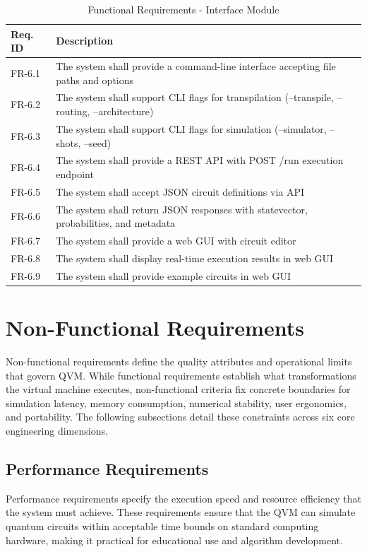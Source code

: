 \begin{table}[H]
\centering
\caption{Functional Requirements - Interface Module}
\begin{tabular}{|p{2cm}|p{11cm}|}
\hline
\textbf{Req. ID} & \textbf{Description} \\
\hline
FR-6.1 & The system shall provide a command-line interface accepting file paths and options \\
\hline
FR-6.2 & The system shall support CLI flags for transpilation (--transpile, --routing, --architecture) \\
\hline
FR-6.3 & The system shall support CLI flags for simulation (--simulator, --shots, --seed) \\
\hline
FR-6.4 & The system shall provide a REST API with POST /run execution endpoint \\
\hline
FR-6.5 & The system shall accept JSON circuit definitions via API \\
\hline
FR-6.6 & The system shall return JSON responses with statevector, probabilities, and metadata \\
\hline
FR-6.7 & The system shall provide a web GUI with circuit editor \\
\hline
FR-6.8 & The system shall display real-time execution results in web GUI \\
\hline
FR-6.9 & The system shall provide example circuits in web GUI \\
\hline
\end{tabular}
\end{table}

\section{Non-Functional Requirements}

Non-functional requirements define the quality attributes and operational limits that govern QVM. While functional requirements establish what transformations the virtual machine executes, non-functional criteria fix concrete boundaries for simulation latency, memory consumption, numerical stability, user ergonomics, and portability. The following subsections detail these constraints across six core engineering dimensions.

\subsection{Performance Requirements}

Performance requirements specify the execution speed and resource efficiency that the system must achieve. These requirements ensure that the QVM can simulate quantum circuits within acceptable time bounds on standard computing hardware, making it practical for educational use and algorithm development.

